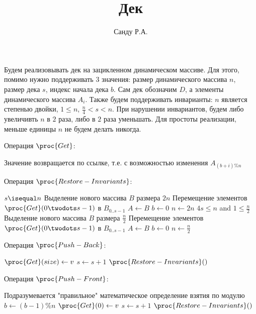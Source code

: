 \documentclass[11pt]{article}
\title{Дек}
\author{Санду Р.А.}
\begin{document}
\maketitle

Будем реализовывать дек на зацикленном динамическом массиве. Для этого, помимо нужно поддерживать 3 значения: размер динамического массива $n$, размер дека $s$, индекс начала дека $b$. Сам дек обозначим $D$, а элементы динамического массива $A_i$. Также будем поддерживать инварианты: $n$ является степенью двойки, $1 \leq n$, $\frac{n}{4}<s<n$. При нарушении инвариантов, будем либо увеличивть $n$ в $2$ раза, либо в $2$ раза уменьшать. Для простоты реализации, меньше единицы $n$ не будем делать никогда.

\hspace{1 mm}

Операция $\proc{Get}$:
\begin{codebox}
\li	\Comment Значение возвращается по ссылке, т.е. с возможностью изменения
\li	\Return $A_{(b+i)\%n}$
\end{codebox}
\hspace{1 mm}

Операция $\proc{Restore-Invariants}$:
\begin{codebox}
\li	\If $s \isequal n$
	\Then
\li		\Comment Выделение нового массива $B$ размера $2n$
\li		\Comment Перемещение элементов $\proc{Get}(0 \twodots s-1)$ в $B_{0..s-1}$
\li		$A \gets B$
\li		$b \gets 0$
\li		$n \gets 2n$
	\ElseIf $4s \leq n$ and $1 \leq \frac{n}{2}$
	\Then
\li		\Comment Выделение нового массива $B$ размера $\frac{n}{2}$
\li		\Comment Перемещение элементов $\proc{Get}(0 \twodots s-1)$ в $B_{0..s-1}$
\li		$A \gets B$
\li		$b \gets 0$
\li		$n \gets \frac{n}{2}$
	\End
\end{codebox}
\hspace{1 mm}

Операция $\proc{Push-Back}$:
\begin{codebox}
\li	$\proc{Get}(size) \gets v$
\li	$s \gets s+1$
\li	$\proc{Restore-Invariants}()$
\end{codebox}
\hspace{1 mm}

Операция $\proc{Push-Front}$:
\begin{codebox}
\li	\Comment Подразумевается "правильное" математическое определение взятия по модулю
\li	$b \gets (b-1)\%n$
\li	$\proc{Get}(0) \gets v$
\li	$s \gets s+1$
\li	$\proc{Restore-Invariants}()$
\end{codebox}
\hspace{1 mm}
\end{document}
